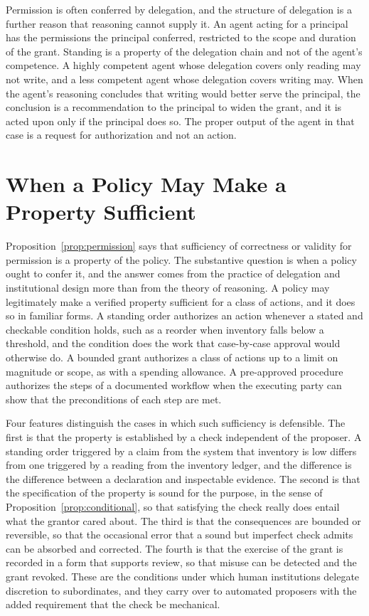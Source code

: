 Permission is often conferred by delegation, and the structure of delegation is a further reason that reasoning cannot supply it. An agent acting for a principal has the permissions the principal conferred, restricted to the scope and duration of the grant. Standing is a property of the delegation chain and not of the agent's competence. A highly competent agent whose delegation covers only reading may not write, and a less competent agent whose delegation covers writing may. When the agent's reasoning concludes that writing would better serve the principal, the conclusion is a recommendation to the principal to widen the grant, and it is acted upon only if the principal does so. The proper output of the agent in that case is a request for authorization and not an action.

\section{When a Policy May Make a Property Sufficient}

Proposition~\ref{prop:permission} says that sufficiency of correctness or validity for permission is a property of the policy. The substantive question is when a policy ought to confer it, and the answer comes from the practice of delegation and institutional design more than from the theory of reasoning. A policy may legitimately make a verified property sufficient for a class of actions, and it does so in familiar forms. A standing order authorizes an action whenever a stated and checkable condition holds, such as a reorder when inventory falls below a threshold, and the condition does the work that case-by-case approval would otherwise do. A bounded grant authorizes a class of actions up to a limit on magnitude or scope, as with a spending allowance. A pre-approved procedure authorizes the steps of a documented workflow when the executing party can show that the preconditions of each step are met.

Four features distinguish the cases in which such sufficiency is defensible. The first is that the property is established by a check independent of the proposer. A standing order triggered by a claim from the system that inventory is low differs from one triggered by a reading from the inventory ledger, and the difference is the difference between a declaration and inspectable evidence. The second is that the specification of the property is sound for the purpose, in the sense of Proposition~\ref{prop:conditional}, so that satisfying the check really does entail what the grantor cared about. The third is that the consequences are bounded or reversible, so that the occasional error that a sound but imperfect check admits can be absorbed and corrected. The fourth is that the exercise of the grant is recorded in a form that supports review, so that misuse can be detected and the grant revoked. These are the conditions under which human institutions delegate discretion to subordinates, and they carry over to automated proposers with the added requirement that the check be mechanical.

